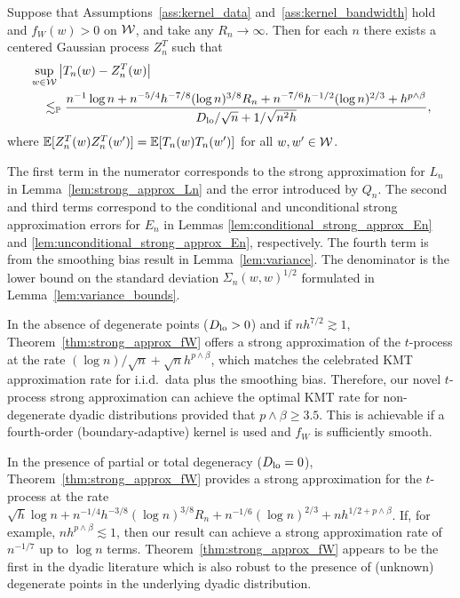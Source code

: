 \begin{theorem}
  \label{thm:strong_approx_fW}

  Suppose that Assumptions~\ref{ass:kernel_data}
  and~\ref{ass:kernel_bandwidth} hold and
  $f_W(w) > 0$ on $\mathcal{W}$, and take any $R_n \to \infty$.
  Then for each $n$ there exists a
  centered Gaussian process $Z_n^{T}$ such that
  \begin{align*}
    &\sup_{w \in \mathcal{W}}
    \left|
    T_n(w)
    -
    Z_n^{T}(w)
    \right| \\
    &\quad\lesssim_{\mathbb{P}}
    \frac{
      n^{-1} \log n
      + n^{-5/4} h^{-7/8} (\log n)^{3/8} R_n
      + n^{-7/6} h^{-1/2} (\log n)^{2/3}
    + h^{p\wedge\beta}}
    {D_{\textup{lo}}/\sqrt{n} + 1/\sqrt{n^2h}},
  \end{align*}
  where $\mathbb{E}[Z_n^T(w)Z_n^T(w')] = \mathbb{E}[T_n(w)T_n(w')]$
  for all $w,w' \in \mathcal{W}$.
\end{theorem}

The first term in the numerator corresponds to
the strong approximation for $L_n$ in Lemma~\ref{lem:strong_approx_Ln}
and the error introduced by $Q_n$.
The second and third terms correspond to the conditional
and unconditional strong approximation errors for
$E_n$ in Lemmas \ref{lem:conditional_strong_approx_En}
and \ref{lem:unconditional_strong_approx_En}, respectively.
The fourth term is from the smoothing bias result
in Lemma~\ref{lem:variance}.
The denominator is the lower bound on the standard
deviation $\Sigma_n(w,w)^{1/2}$
formulated in Lemma~\ref{lem:variance_bounds}.

In the absence of degenerate points ($D_{\textup{lo}} > 0$) and if
$n h^{7/2}\gtrsim 1$, Theorem~\ref{thm:strong_approx_fW}
offers a strong approximation of the $t$-process at the rate
$(\log n)/\sqrt{n}+\sqrt{n}h^{p\wedge\beta}$, which matches the celebrated KMT
approximation rate for i.i.d.\ data plus the
smoothing bias.
Therefore, our novel $t$-process strong
approximation can achieve the optimal KMT rate for
non-degenerate dyadic
distributions provided that $p\wedge\beta \geq 3.5$.
This is achievable
if a fourth-order (boundary-adaptive) kernel is used
and $f_W$ is sufficiently smooth.

In the presence of partial or total degeneracy ($D_{\textup{lo}} =0$),
Theorem~\ref{thm:strong_approx_fW} provides a strong approximation for the
$t$-process at the rate
$\sqrt{h}\log n + n^{-1/4}h^{-3/8}(\log n)^{3/8} R_n +
n^{-1/6}(\log n)^{2/3} + n h^{1/2+p\wedge\beta}$.
If, for example, $n h^{p\wedge\beta}\lesssim 1$,
then our result can achieve a strong
approximation rate of $n^{-1/7}$
up to $\log n $ terms.
Theorem~\ref{thm:strong_approx_fW}
appears to be the first in the dyadic literature
which is also robust to the presence of (unknown)
degenerate points in the underlying dyadic distribution.

